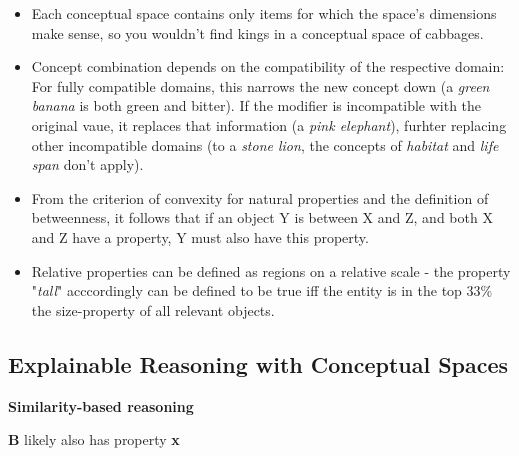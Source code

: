 \begin{itemize}
    \item Each conceptual space contains only items for which the space's dimensions make sense, so you wouldn't find kings in a conceptual space of cabbages.
    \item Concept combination depends on the compatibility of the respective domain: For fully compatible domains, this narrows the new concept down (a \textit{green banana} is both green and bitter). If the modifier is incompatible with the original vaue, it replaces that information (\eg a \textit{pink elephant}), furhter replacing other incompatible domains (\eg to a \textit{stone lion}, the concepts of \textit{habitat} and \textit{life span} don't apply).
    \item From the criterion of convexity for natural properties and the definition of betweenness, it follows that if an object Y is between X and Z, and both X and Z have a property, Y must also have this property.
    \item Relative properties can be defined as regions on a relative scale - the property "\textit{tall}" acccordingly can be defined to be true iff the entity is in the top 33\% \wrt the size-property of all relevant objects.
\end{itemize}








\subsection{Explainable Reasoning with Conceptual Spaces}
\label{sec:reasoning}

\textbf{Similarity-based reasoning}

\noindent
\begin{minipage}{.5\textwidth}
\end{minipage}%
\begin{minipage}{.5\textwidth}
             {\textbf{B} likely also has property \textbf{x}}
\end{minipage}%


